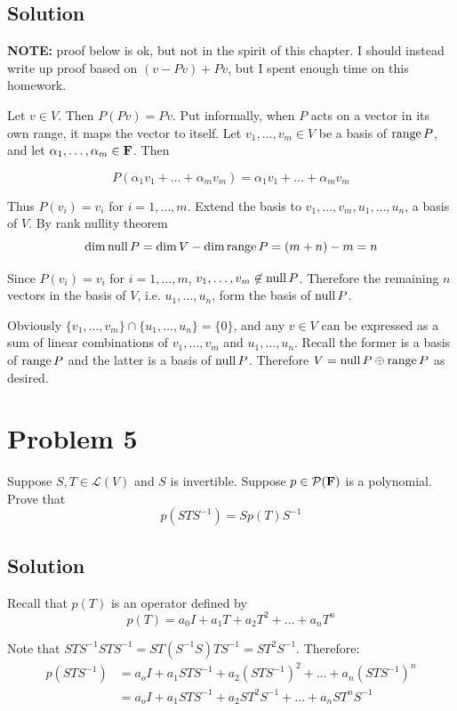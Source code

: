 \documentclass{article}
\begin{document}
\subsection*{Solution}
\textbf{NOTE:} proof below is ok, but not in the spirit of this chapter. I should instead write up proof based on $(v-Pv)+Pv$, but I spent enough time on this homework.

\vs

Let $v\in V$. Then $P(Pv)=Pv$. Put informally, when $P$ acts on a vector in its own range, it maps the vector to itself. Let $v_1,\ldots,v_m\in V$ be a basis of $\text{range}\, P$, and let $\alpha_1,\ldots,\alpha_m\in\mathbf{F}$. Then

\[P(\alpha_1v_1+\ldots+\alpha_m v_m)=\alpha_1v_1+\ldots+\alpha_m v_m\]

Thus $P(v_i)=v_i$ for $i=1,\ldots,m$. Extend the basis to $v_1,\ldots,v_m,u_1,\ldots,u_n$, a basis of $V$. By rank nullity theorem
\[\dim\text{null}\, P=\dim V-\dim\text{range}\, P=(m+n)-m=n\]

Since $P(v_i)=v_i$ for $i=1,\ldots,m$, $v_1,\ldots,v_m\not\in\text{null}\, P$. Therefore the remaining $n$ vectors in the basis of $V$, i.e. $u_1,\ldots,u_n$, form the basis of $\text{null}\, P$.

\vs

Obviously $\{v_1,\ldots,v_m\}\cap\{u_1,\ldots,u_n\}=\{0\}$, and any $v\in V$ can be expressed as a sum of linear combinations of $v_1,\ldots,v_m$ and $u_1,\ldots,u_n$. Recall the former is a basis of $\text{range}\, P$ and the latter is a basis of $\text{null}\, P$. Therefore $V=\text{null}\, P\oplus \text{range}\, P$ as desired.

\section*{Problem 5}
Suppose $S,T\in\mathcal{L}(V)$ and $S$ is invertible. Suppose $p\in\mathcal{P}(\mathbf{F})$ is a polynomial. Prove that
\[p(STS^{-1})=Sp(T)S^{-1}\]

\subsection*{Solution}
Recall that $p(T)$ is an operator defined by
\[p(T)=a_0I + a_1T+a_2T^2+\ldots+a_n T^n\]

Note that $STS^{-1}STS^{-1}=ST(S^{-1}S)TS^{-1}=ST^2S^{-1}$. Therefore:
\begin{align*}
p(STS^{-1})&=a_oI + a_1STS^{-1}+a_2(STS^{-1})^2+\ldots+a_n (STS^{-1})^n\\
&=a_oI + a_1STS^{-1}+a_2ST^2S^{-1}+\ldots+a_n ST^nS^{-1}
\end{align*}
\end{document}
